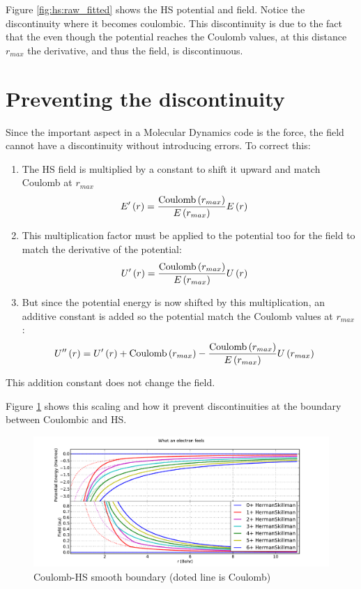 \documentclass[12pt,letterpaper]{article}
\begin{document}
Figure \ref{fig:hs:raw_fitted} shows the HS potential and field. Notice the discontinuity where it becomes
coulombic. This discontinuity is due to the fact that the even though the potential reaches the
Coulomb values, at this distance $r_{max}$ the derivative, and thus the field, is discontinuous.

\section{Preventing the discontinuity}
Since the important aspect in a Molecular Dynamics code is the force, the field cannot have a
discontinuity without introducing errors. To correct this:
\begin{enumerate}
\item The HS field is multiplied by a constant to shift it upward and match Coulomb at $r_{max}$
\begin{align}
E'\left( r \right) & = \frac{\textrm{Coulomb}\left( r_{max} \right)}{E\left( r_{max} \right)} E\left( r \right)
\end{align}
\item This multiplication factor must be applied to the potential too for the field to match the derivative of the potential:
\begin{align}
U'\left( r \right) & = \frac{\textrm{Coulomb}\left( r_{max} \right)}{E\left( r_{max} \right)} U\left( r \right)
\end{align}
\item But since the potential energy is now shifted by this multiplication, an additive constant is added so the potential match the Coulomb values at $r_{max}$:
\begin{align}
U''\left( r \right) & = U'\left( r \right) + \textrm{Coulomb}\left( r_{max} \right) - \frac{\textrm{Coulomb}\left( r_{max} \right)}{E\left( r_{max} \right)} U\left( r_{max} \right)
\end{align}
\end{enumerate}
This addition constant does not change the field.

Figure \ref{fig:hs:smooth_scaled} shows this scaling and how it prevent discontinuities at the boundary between Coulombic and HS.

\begin{figure}
\includegraphics[width=0.98\columnwidth]{hs_2_smooth_scaled}
\caption{\label{fig:hs:smooth_scaled}Coulomb-HS smooth boundary (doted line is Coulomb)}
\end{figure}
\end{document}
